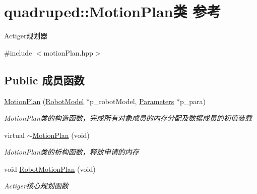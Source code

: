 \hypertarget{classquadruped_1_1MotionPlan}{}\section{quadruped\+:\+:Motion\+Plan类 参考}
\label{classquadruped_1_1MotionPlan}


Actiger规划器  




{\ttfamily \#include $<$motion\+Plan.\+hpp$>$}

\subsection*{Public 成员函数}
\begin{DoxyCompactItemize}
\item 
\hyperlink{classquadruped_1_1MotionPlan_af79f137bc037fa02681bded5c26b3a98}{Motion\+Plan} (\hyperlink{classquadruped_1_1RobotModel}{Robot\+Model} $\ast$p\+\_\+robot\+Model, \hyperlink{classquadruped_1_1Parameters}{Parameters} $\ast$p\+\_\+para)
\begin{DoxyCompactList}\small\item\em Motion\+Plan类的构造函数，完成所有对象成员的内存分配及数据成员的初值装载 \end{DoxyCompactList}\item 
\mbox{\label{classquadruped_1_1MotionPlan_a0b9fd05864416d513ef8fc144b2ce4c5}} 
virtual \hyperlink{classquadruped_1_1MotionPlan_a0b9fd05864416d513ef8fc144b2ce4c5}{$\sim$\+Motion\+Plan} (void)
\begin{DoxyCompactList}\small\item\em Motion\+Plan类的析构函数，释放申请的内存 \end{DoxyCompactList}\item 
\mbox{\label{classquadruped_1_1MotionPlan_ab8e8aa634d2bc8cc8d10ae16d8e4b928}} 
void \hyperlink{classquadruped_1_1MotionPlan_ab8e8aa634d2bc8cc8d10ae16d8e4b928}{Robot\+Motion\+Plan} (void)
\begin{DoxyCompactList}\small\item\em Actiger核心规划函数 \end{DoxyCompactList}\item 
\mbox{\label{classquadruped_1_1MotionPlan_a4aab89067581b6c44636eed8e71fb8c2}} 

\end{DoxyCompactItemize}
